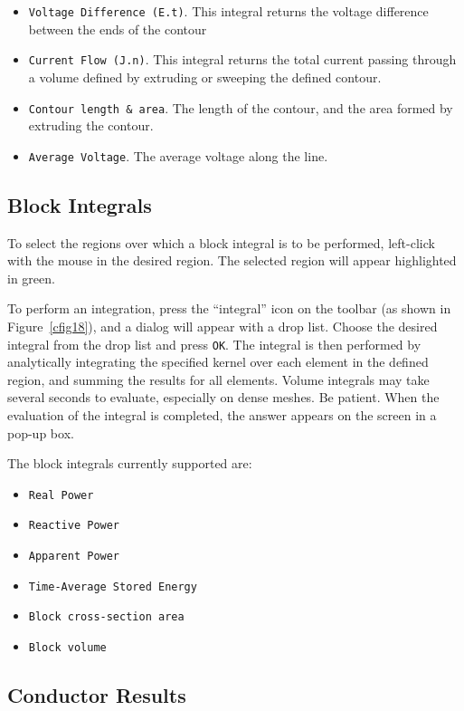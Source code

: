 \begin{itemize}
\item \texttt{Voltage Difference (E.t)}. This integral returns the 
voltage difference between the ends of the contour

\item \texttt{Current Flow (J.n)}. This integral returns the total current passing through
a volume defined by extruding or sweeping the defined contour.

\item \texttt{Contour length \& area}. The length of the contour, and the area formed by
extruding the contour.

\item \texttt{Average Voltage}. The average voltage along the line.
\end{itemize}



\subsection{Block Integrals}

To select the regions over which a block integral is to be performed,
left-click with the mouse in the desired region. The selected region will
appear highlighted in green.

To perform an integration, press the ``integral'' icon on the
toolbar (as shown in Figure~\ref{cfig18}), and a dialog will appear
with a drop list. Choose the desired integral from the drop list
and press \texttt{OK}. The integral is then performed by
analytically integrating the specified kernel over each element in
the defined region, and summing the results for all elements.
Volume integrals may take several seconds to evaluate, especially
on dense meshes. Be patient. When the evaluation of the integral is
completed, the answer appears on the screen in a pop-up box.

The block integrals currently supported are:
\begin{itemize}
\item \texttt{Real Power}
\item \texttt{Reactive Power}
\item \texttt{Apparent Power}
\item \texttt{Time-Average Stored Energy}
\item \texttt{Block cross-section area}
\item \texttt{Block volume}
\end{itemize}
\subsection{Conductor Results}

